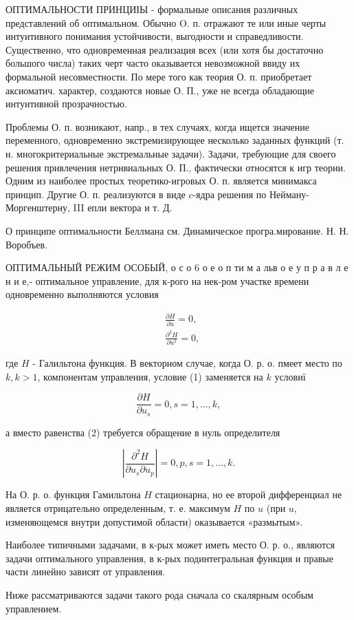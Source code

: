 \documentclass[10pt]{article}
\begin{document}
ОПТИМАЛЬНОСТИ ПРИНЦИІЫ - формальные описания различных представлений об оптимальном. Обычно O. п. отражают те или иные черты интуитивного понимания устойчивости, выгодности и справедливости. Существенно, что одновременная реализация всех (или хотя бы достаточно большого числа) таких черт часто оказывается невозможной ввиду их формальной несовместности. По мере того как теория О. п. приобретает аксиоматич. характер, создаются новые О. П., уже не всегда обладающие интуитивной прозрачностью.

Проблемы О. п. возникают, напр., в тех случаях, когда ищется значение переменного, одновременно экстремизирующее несколько заданных функций (т. н. многокритериальные экстремальные задачи). Задачи, требующие для своего решения привлечения нетривиальных О. П., фактически относятся к игр теории. Одним из наиболее простых теоретико-игровых О. п. является минимакса принцип. Другие О. п. реализуются в виде $c$-ядра решения по Нейману-Моргенштерну, III епли вектора и т. Д.

О принципе оптимальности Беллмана см. Динамическое програ.мирование. Н. Н. Воробъев.

ОПТИМАЛЬНЫЙ РЕЖИМ ОСОБЫЙ, о с о 6 о е о п ти м а льв о е у п р а в л е н и е,- оптимальное управление, для к-рого на нек-ром участке времени одновременно выполняются условия

\[
\begin{aligned}
& \frac{\partial H}{\partial u}=0, \\
& \frac{\partial^{2} H}{\partial u^{2}}=0,
\end{aligned}
\]

где $H$ - Галильтона функция. В векторном случае, когда О. р. о. пмеет место по $k, k>1$, компонентам управления, условие (1) заменяется на $k$ условиї

\[
\frac{\partial H}{\partial u_{s}}=0, s=1, \ldots, k,
\]

а вместо равенства (2) требуется обращение в нуль определителя

\[
\left|\frac{\partial^{2} H}{\partial u_{s} \partial u_{p}}\right|=0, p, s=1, \ldots, k .
\]

На О. р. о. функция Гамильтона $H$ стационарна, но ее второй дифференциал не является отрицательно определенным, т. е. максимум $H$ по $u$ (при $u$, изменяющемся внутри допустимой области) оказывается «размытым».

Наиболее типичными задачами, в к-рых может иметь место О. р. о., являются задачи оптимального управления, в к-рых подинтегральная функция и правые части линейно зависят от управления.

Ниже рассматриваются задачи такого рода сначала со скалярным особым управлением.
\end{document}
